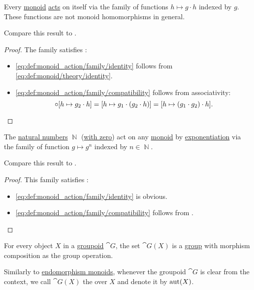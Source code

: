 \begin{proposition}\label{thm:monoid_is_action}
  Every \hyperref[def:monoid]{monoid} \hyperref[def:monoid_action]{acts} on itself via the family of functions \( h \mapsto g \cdot h \) indexed by \( g \). These functions are not monoid homomorphisms in general.

  Compare this result to .
\end{proposition}
\begin{proof}
  The family satisfies :
  \begin{itemize}
    \item \ref{eq:def:monoid_action/family/identity} follows from \eqref{eq:def:monoid/theory/identity}.

    \item \ref{eq:def:monoid_action/family/compatibility} follows from associativity:
    \begin{equation*}
      [h \mapsto g_1 \cdot h] \bincirc [h \mapsto g_2 \cdot h] = [h \mapsto g_1 \cdot (g_2 \cdot h)] = [h \mapsto (g_1 \cdot g_2) \cdot h].
    \end{equation*}
  \end{itemize}
\end{proof}

\begin{proposition}\label{thm:exponentiation_monoid_action}
  The \hyperref[def:set_of_natural_numbers]{natural numbers} \( \BbbN \) (\hyperref[rem:peano_arithmetic_zero]{with zero}) act on any \hyperref[def:monoid]{monoid} by \hyperref[def:monoid/exponentiation]{exponentiation} via the family of function \( g \mapsto g^n \) indexed by \( n \in \BbbN \).

  Compare this result to .
\end{proposition}
\begin{proof}
  This family satisfies :
  \begin{itemize}
    \item \ref{eq:def:monoid_action/family/identity} is obvious.
    \item \ref{eq:def:monoid_action/family/compatibility} follows from .
  \end{itemize}
\end{proof}

\begin{definition}\label{def:automorphism_group}
  For every object \( X \) in a \hyperref[def:groupoid]{groupoid} \( \cat{G} \), the set \( \cat{G}(X) \) is a \hyperref[def:group]{group} with morphism composition as the group operation.

  Similarly to \hyperref[def:endomorphism_monoid]{endomorphism monoids}, whenever the groupoid \( \cat{G} \) is clear from the context, we call \( \cat{G}(X) \) the  over \( X \) and denote it by \( \operatorname{aut}(X) \).
\end{definition}

